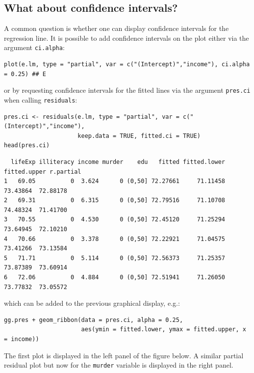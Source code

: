 \documentclass[12pt]{article}
\begin{document}
\bigskip

\subsection{What about confidence intervals?}
\label{sec:org6cb8d6e}

A common question is whether one can display confidence intervals for
the regression line. It is possible to add confidence intervals on the
plot either via the argument \texttt{ci.alpha}:
\lstset{language=r,label= ,caption= ,captionpos=b,numbers=none}
\begin{lstlisting}
plot(e.lm, type = "partial", var = c("(Intercept)","income"), ci.alpha = 0.25) ## E
\end{lstlisting}

or by requesting confidence intervals for the fitted lines via the
argument \texttt{pres.ci} when calling \texttt{residuals}:
\lstset{language=r,label= ,caption= ,captionpos=b,numbers=none}
\begin{lstlisting}
pres.ci <- residuals(e.lm, type = "partial", var = c("(Intercept)","income"),
                     keep.data = TRUE, fitted.ci = TRUE)
head(pres.ci)
\end{lstlisting}

\begin{verbatim}
  lifeExp illiteracy income murder    edu   fitted fitted.lower fitted.upper r.partial
1   69.05          0  3.624      0 (0,50] 72.27661     71.11458     73.43864  72.88178
2   69.31          0  6.315      0 (0,50] 72.79516     71.10708     74.48324  71.41700
3   70.55          0  4.530      0 (0,50] 72.45120     71.25294     73.64945  72.10210
4   70.66          0  3.378      0 (0,50] 72.22921     71.04575     73.41266  73.13584
5   71.71          0  5.114      0 (0,50] 72.56373     71.25357     73.87389  73.60914
6   72.06          0  4.884      0 (0,50] 72.51941     71.26050     73.77832  73.05572
\end{verbatim}


which can be added to the previous graphical display, e.g.:
\lstset{language=r,label= ,caption= ,captionpos=b,numbers=none}
\begin{lstlisting}
gg.pres + geom_ribbon(data = pres.ci, alpha = 0.25,
                      aes(ymin = fitted.lower, ymax = fitted.upper, x = income))
\end{lstlisting}

The first plot is displayed in the left panel of the figure below. A
similar partial residual plot but now for the \texttt{murder} variable is
displayed in the right panel.
\end{document}
